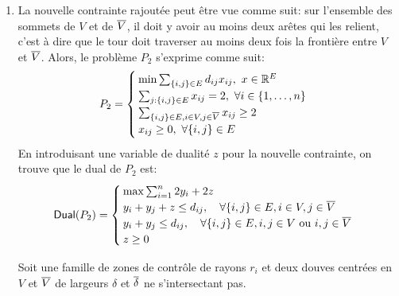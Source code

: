 {\begin{td-sol}[]
\begin{enumerate}
            On en conclut alors que pour passer d'un sommet de \(V\) au sommet le plus proche dans \(V'\) il faut passer par les deux douves une première fois, puis une autre au retour.
            En y ajoutant les déplacements à l'intérieur même de ces douves on obtient bien
            \begin{equation*}
                \sum_{\{i, j\}\in S} d_{ij} \geq \sum_{i=1} 2 r_i + 2\delta + 2 \ol\delta
            \end{equation*}

            \item La nouvelle contrainte rajoutée peut être vue comme suit: sur l'ensemble des sommets de \(V\) et de \(\overline{V}\), il doit y avoir au moins deux arêtes qui les relient, c'est à dire que le tour doit traverser au moins deux fois la frontière entre \(V\) et \(\overline{V}\).
            Alors, le problème \(P_2\) s'exprime comme suit:
            \begin{equation*}
                P_2 = 
                \begin{cases}
                    \min \sum_{\{i,j\}\in E} d_{ij} x_{ij},\ x\in\mathbb{R}^E\\
                    \sum_{j:\{i,j\}\in E} x_{ij} = 2,\ \forall i \in \{1,\ldots,n\}\\
                    \sum_{\{i,j\}\in E, i\in V, j\in \overline{V}} x_{ij} \geq 2\\
                    x_{ij} \geq 0,\ \forall \{i,j\} \in E
                \end{cases}
            \end{equation*}
            En introduisant une variable de dualité \(z\) pour la nouvelle contrainte, on trouve que le dual de \(P_2\) est:
            \begin{equation*}
                \mathsf{Dual}(P_2) =
                \begin{cases}
                    \max \sum_{i=1}^n 2y_i + 2z \\
                    y_i + y_j + z \le d_{ij}, \quad \forall \{i,j\}\in E, i\in V, j\in \overline{V} \\
                    y_i + y_j \le d_{ij}, \quad \forall \{i,j\}\in E, i,j\in V \text{ ou } i,j\in \overline{V} \\
                    z \geq 0
                \end{cases}
            \end{equation*}

            Soit une famille de zones de contrôle de rayons \(r_i\) et deux douves centrées en \(V\) et \(\overline{V}\) de largeurs \(\delta\) et \(\overline{\delta}\) ne s'intersectant pas.


\end{enumerate}
\end{td-sol}}
